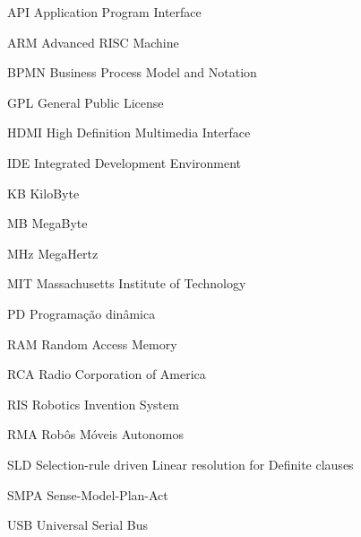 \begin{siglas}
\item[API] Application Program Interface
\item[ARM]  Advanced RISC Machine
\item[BPMN] Business Process Model and Notation
\item[GPL] General Public License
\item[HDMI] High Definition Multimedia Interface
\item[IDE] Integrated Development Environment
\item[KB] KiloByte
\item[MB] MegaByte
\item[MHz] MegaHertz
\item[MIT] Massachusetts Institute of Technology
\item[PD] Programação dinâmica
\item[RAM] Random Access Memory
\item[RCA] Radio Corporation of America
\item[RIS] Robotics Invention System
\item[RMA] Robôs Móveis Autonomos
\item[SLD] Selection-rule driven Linear resolution for Definite clauses
\item[SMPA] Sense-Model-Plan-Act
\item[USB] Universal Serial Bus
\end{siglas}
